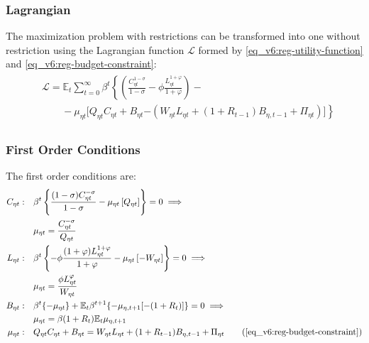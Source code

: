 \documentclass[../thesis.tex]{subfiles}
\begin{document}
\subsubsection*{Lagrangian}

	The maximization problem with restrictions can be transformed into one without restriction using the Lagrangian function $\mathcal{L}$ formed by \ref{eq_v6:reg-utility-function} and \ref{eq_v6:reg-budget-constraint}:
	\begin{align}
		\begin{split}
		& \mathcal{L} = \mathbb{E}_t \sum_{t=0}^{\infty} \beta^t \left\{ \left( \frac{C_{\eta t}^{1 -\sigma}}{1 -\sigma} - \phi \frac{L_{\eta t}^{1+\varphi}}{1+\varphi} \right) \right. - 
		\\ & \qquad - \mu_{\eta t} \Big[ Q_{\eta t} C_{\eta t} + B_{\eta t} \left. - ( W_{\eta t} L_{\eta t} + (1 + R_{t-1}) B_{\eta,t-1} + \Pi_{\eta t} ) \Big] \right\} \label{eq_v6:reg-household-lagrangian}
		\end{split}
	\end{align}

\subsubsection*{First Order Conditions}

The first order conditions are:
\begin{align}
	C_{\eta t}: &\quad \beta^t \left\{ \frac{(1 -\sigma) C_{\eta t}^{-\sigma}}{1-\sigma} - \mu_{\eta t} \left[ Q_{\eta t} \right] \right\} = 0 \implies \nonumber \\
	&\quad \mu_{\eta t} = \frac{C_{\eta t}^{-\sigma}}{Q_{\eta t}} \label{eq_v6:reg-FOC-C-eta-t}
	\\
	L_{\eta t}: &\quad \beta^t \left\{ -\phi \frac{(1+\varphi) L_{\eta t}^{1 + \varphi}}{1 + \varphi} - \mu_{\eta t} \left[ -W_{\eta t} \right] \right\} = 0 \implies \nonumber \\
	&\quad \mu_{\eta t} = \frac{\phi L_{\eta t}^{\varphi}}{W_{\eta t}} \label{eq_v6:reg-FOC-Lt}
	\\
	B_{\eta t}: &\quad \beta^t \{-\mu_{\eta t}\} + \E \beta^{t+1} \{ -\mu_{\eta, t+1} [-(1 + R_{t})] \} = 0 \implies \nonumber
	\\ &\quad \mu_{\eta t} = \beta (1 + R_{t}) \E{ \mu_{\eta, t+1}} \label{eq_v6:reg-FOC-Bt}
	\\
	\mu_{\eta t}: &\quad Q_{\eta t} C_{\eta t} + B_{\eta t} = W_{\eta t} L_{\eta t} + (1 + R_{t-1}) B_{\eta,t-1} + \Pi_{\eta t} \tag{\ref{eq_v6:reg-budget-constraint}}
\end{align}
\end{document}

